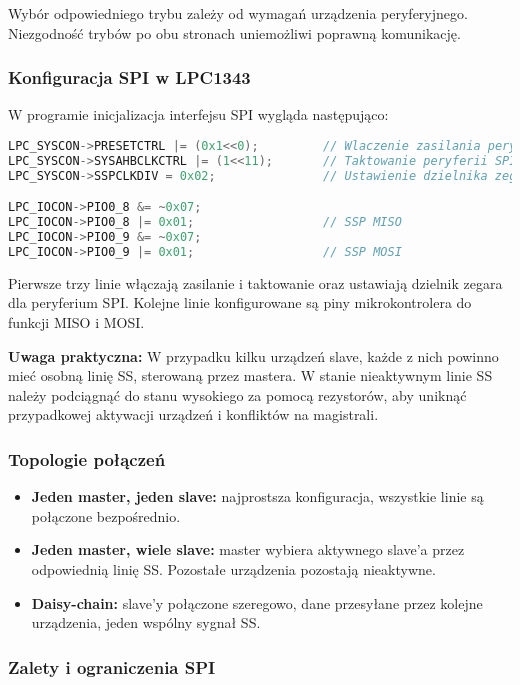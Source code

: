 \documentclass[a4paper,12pt]{report}
\begin{document}
Wybór odpowiedniego trybu zależy od wymagań urządzenia peryferyjnego. Niezgodność trybów po obu stronach uniemożliwi poprawną komunikację.

\subsubsection*{Konfiguracja SPI w LPC1343}

W programie inicjalizacja interfejsu SPI wygląda następująco:
\begin{lstlisting}[language=C]
LPC_SYSCON->PRESETCTRL |= (0x1<<0);         // Wlaczenie zasilania peryferii SPI
LPC_SYSCON->SYSAHBCLKCTRL |= (1<<11);       // Taktowanie peryferii SPI
LPC_SYSCON->SSPCLKDIV = 0x02;               // Ustawienie dzielnika zegara SPI

LPC_IOCON->PIO0_8 &= ~0x07;
LPC_IOCON->PIO0_8 |= 0x01;                  // SSP MISO
LPC_IOCON->PIO0_9 &= ~0x07;
LPC_IOCON->PIO0_9 |= 0x01;                  // SSP MOSI
\end{lstlisting}
Pierwsze trzy linie włączają zasilanie i taktowanie oraz ustawiają dzielnik zegara dla peryferium SPI. Kolejne linie konfigurowane są piny mikrokontrolera do funkcji MISO i MOSI.

\textbf{Uwaga praktyczna:} W przypadku kilku urządzeń slave, każde z nich powinno mieć osobną linię SS, sterowaną przez mastera. W stanie nieaktywnym linie SS należy podciągnąć do stanu wysokiego za pomocą rezystorów, aby uniknąć przypadkowej aktywacji urządzeń i konfliktów na magistrali.

\subsubsection*{Topologie połączeń}

\begin{itemize}
    \item \textbf{Jeden master, jeden slave:} najprostsza konfiguracja, wszystkie linie są połączone bezpośrednio.
    \item \textbf{Jeden master, wiele slave:} master wybiera aktywnego slave'a przez odpowiednią linię SS. Pozostałe urządzenia pozostają nieaktywne.
    \item \textbf{Daisy-chain:} slave'y połączone szeregowo, dane przesyłane przez kolejne urządzenia, jeden wspólny sygnał SS.
\end{itemize}

\subsubsection*{Zalety i ograniczenia SPI}
\end{document}
